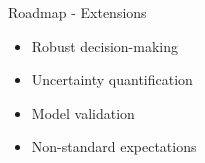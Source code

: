 \begin{frame}{Roadmap - Extensions}

\begin{itemize}\setlength\itemsep{1em}
\item Robust decision-making
\item Uncertainty quantification
\item Model validation
\item Non-standard expectations
\end{itemize}
\end{frame}
